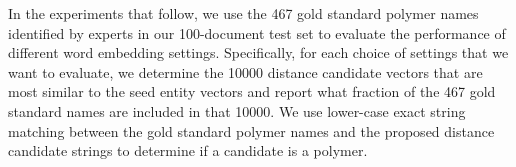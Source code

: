 
In the experiments that follow,
we use the 467 gold standard polymer names identified by experts in our 100-document test set to
evaluate the performance of different word embedding settings.
Specifically, for each choice of settings that we want to evaluate,
we determine the \num{10000} distance candidate vectors that are most similar to the seed entity vectors 
and report what fraction of the 467 gold standard names are included in that \num{10000}.
We use lower-case exact string matching between the gold standard polymer names and the proposed distance candidate strings to determine if a candidate is a polymer.


